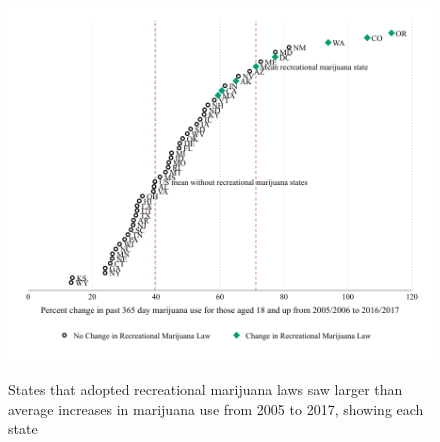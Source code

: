 \documentclass[12pt]{article}%
\begin{document}
\begin{figure}[H]
\caption{States that adopted recreational marijuana laws saw larger than average increases in marijuana use from 2005 to 2017, showing each state}
  \includegraphics[width=\linewidth]{../output/plots/per_diff_mj_use_365_18.pdf}
   \label{fig:per_diff_mj_use_365_18}
\end{figure}
\end{document}
